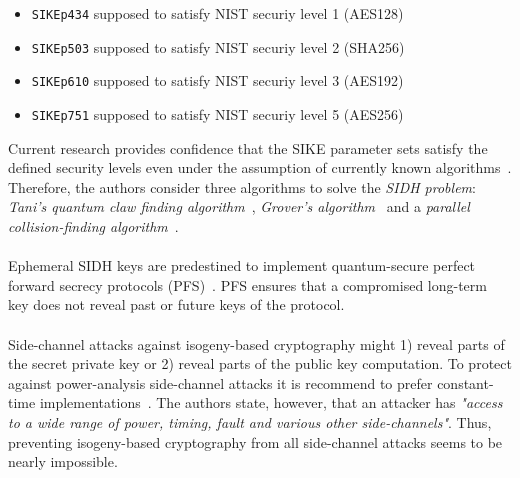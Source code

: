 \begin{itemize}
\itemsep0em 
	\item \texttt{SIKEp434} supposed to satisfy NIST securiy level 1 (AES128)
	\item \texttt{SIKEp503} supposed to satisfy NIST securiy level 2 (SHA256)
	\item \texttt{SIKEp610} supposed to satisfy NIST securiy level 3 (AES192)
	\item \texttt{SIKEp751} supposed to satisfy NIST securiy level 5 (AES256)
\end{itemize}
Current research provides confidence that the SIKE parameter sets satisfy the defined security levels even under the assumption of currently known algorithms~\parencite{jaques2019quantum}. Therefore, the authors consider three algorithms to solve the \textit{SIDH problem}: \textit{Tani's quantum claw finding algorithm}~\parencite{tani2009claw}, \textit{Grover's algorithm}~\parencite{grover1996fast} and a \textit{parallel collision-finding algorithm}~\parencite{van1999parallel}.
\\\\
Ephemeral SIDH keys are predestined to implement quantum-secure perfect forward secrecy protocols (PFS)~\parencite{koziel2018high}. PFS ensures that a compromised long-term key does not reveal past or future keys of the protocol.
\\\\
Side-channel attacks against isogeny-based cryptography might 1) reveal parts of the secret private key or 2) reveal parts of the public key computation. To protect against power-analysis side-channel attacks it is recommend to prefer constant-time implementations~\parencite{sike2020spec}. The authors state, however, that an attacker has \textit{"access to a wide range of power, timing, fault and various other side-channels"}. Thus, preventing isogeny-based cryptography from all side-channel attacks seems to be nearly impossible.
